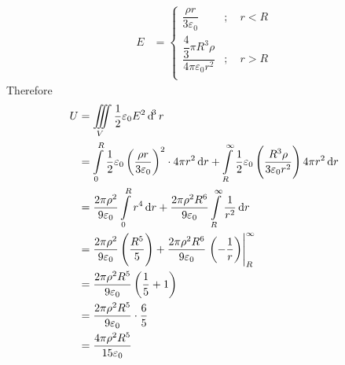 \documentclass[fleqn, a4paper, 12pt, twoside]{article}
\theoremstyle{definition}
\theoremstyle{theorem}
\begin{document}
\begin{solution}
	\begin{align*}
		E &= 
			\begin{cases}
				\dfrac{\rho r}{3 \varepsilon_0}                            & ;\quad r < R \\
				\dfrac{\dfrac{4}{3} \pi R^3 \rho}{4 \pi \varepsilon_0 r^2} & ;\quad r > R \\
			\end{cases}
	\end{align*}
	Therefore
	\begin{align*}
		U & = \iiint\limits_{V} \dfrac{1}{2} \varepsilon_0 E^2 \dif^3 r                                                                                                                                                                                          \\
                  & = \int\limits_{0}^{R} \dfrac{1}{2} \varepsilon_0 \left( \dfrac{\rho r}{3 \varepsilon_0} \right)^2 \cdot 4 \pi r^2 \dif r + \int\limits_{R}^{\infty} \dfrac{1}{2} \varepsilon_0 \left( \dfrac{R^3 \rho}{3 \varepsilon_0 r^2} \right) 4 \pi r^2 \dif r \\
                  & = \dfrac{2 \pi \rho^2}{9 \varepsilon_0} \int\limits_{0}^{R} r^4 \dif r + \dfrac{2 \pi \rho^2 R^6}{9 \varepsilon_0} \int\limits_{R}^{\infty} \dfrac{1}{r^2} \dif r                                                                                    \\
                  & = \dfrac{2 \pi \rho^2}{9 \varepsilon_0} \left( \dfrac{R^5}{5} \right) + \dfrac{2 \pi \rho^2 R^6}{9 \varepsilon_0} \left. \left( -\dfrac{1}{r} \right) \right|_{R}^{\infty}                                                                           \\
                  & = \dfrac{2 \pi \rho^2 R^5}{9 \varepsilon_0} \left( \dfrac{1}{5} + 1 \right)                                                                                                                                                                          \\
                  & = \dfrac{2 \pi \rho^2 R^5}{9 \varepsilon_0} \cdot \dfrac{6}{5}                                                                                                                                                                                       \\
                  & = \dfrac{4 \pi \rho^2 R^5}{15 \varepsilon_0}
	\end{align*}
\end{solution}
\end{document}

